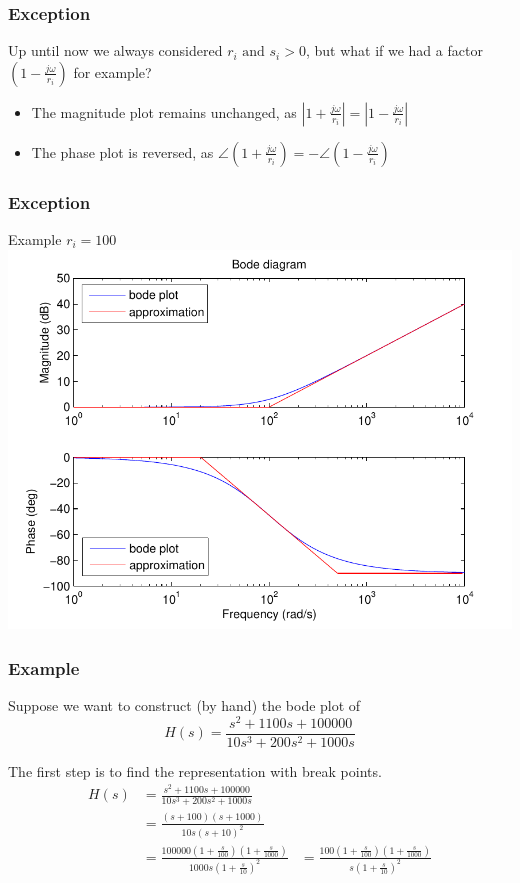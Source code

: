 \begin{frame}
\frametitle{Exception}
Up until now we always considered $r_i \text{ and } s_i > 0$, but what if we had a factor $(1-\frac{j\omega}{r_i})$ for example?
\begin{itemize}
\item The magnitude plot remains unchanged, as $|1+\frac{j\omega}{r_i}| = |1 - \frac{j\omega}{r_i} |$
\item The phase plot is reversed, as $\angle(1+\frac{j\omega}{r_i}) = -\angle(1 - \frac{j\omega}{r_i})$
\end{itemize}

\end{frame}


\begin{frame}
\frametitle{Exception}
Example $r_i = 100$
\includegraphics[scale=0.5]{BodeException}

\end{frame}


\begin{frame}
\frametitle{Example}
Suppose we want to construct (by hand) the bode plot of $$H(s) = \frac{s^2 + 1100s + 100000}{10s^3 + 200s^2 + 1000s}$$

The first step is to find the representation with break points.
\begin{align*}
    H(s) &=  \frac{s^2 + 1100s + 100000}{10s^3 + 200s^2 + 1000s}\\
            &= \frac{(s+100)(s+1000)}{10s(s+10)^2}\\
	 &= \frac{100000(1+\frac{s}{100})(1+\frac{s}{1000})}{1000s(1+\frac{s}{10})^2}
	 &= \frac{100(1+\frac{s}{100})(1+\frac{s}{1000})}{s(1+\frac{s}{10})^2}
\end{align*}

\end{frame}

